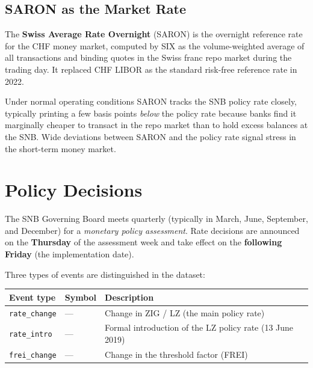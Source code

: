 \documentclass[12pt,a4paper]{article}
\begin{document}
\subsection{SARON as the Market Rate}

The \textbf{Swiss Average Rate Overnight} (SARON) is the overnight reference
rate for the CHF money market, computed by SIX as the volume-weighted average
of all transactions and binding quotes in the Swiss franc repo market during
the trading day.  It replaced CHF LIBOR as the standard risk-free reference
rate in 2022.

Under normal operating conditions SARON tracks the SNB policy rate closely,
typically printing a few basis points \emph{below} the policy rate because
banks find it marginally cheaper to transact in the repo market than to hold
excess balances at the SNB.  Wide deviations between SARON and the policy rate
signal stress in the short-term money market.

\section{Policy Decisions}

The SNB Governing Board meets quarterly (typically in March, June, September,
and December) for a \emph{monetary policy assessment}.  Rate decisions are
announced on the \textbf{Thursday} of the assessment week and take effect on the
\textbf{following Friday} (the implementation date).

\medskip
\noindent Three types of events are distinguished in the dataset:

\begin{center}
\begin{tabular}{llL{7cm}}
  \toprule
  Event type & Symbol & Description \\
  \midrule
  \texttt{rate\_change} & --- & Change in ZIG / LZ (the main policy rate) \\
  \texttt{rate\_intro}  & --- & Formal introduction of the LZ policy rate
                                 (13 June 2019) \\
  \texttt{frei\_change} & --- & Change in the threshold factor (FREI) \\
  \bottomrule
\end{tabular}
\end{center}
\end{document}

